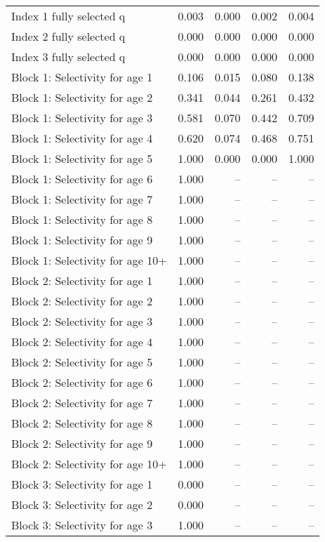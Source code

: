 \documentclass[
]{article}
\begin{document}
\begin{landscape}
\begin{longtable}[t]{lrrrr}
\endfoot
\bottomrule
\endlastfoot
Index 1 fully selected q & 0.003 & 0.000 & 0.002 & 0.004\\
Index 2 fully selected q & 0.000 & 0.000 & 0.000 & 0.000\\
Index 3 fully selected q & 0.000 & 0.000 & 0.000 & 0.000\\
Block 1: Selectivity for age 1 & 0.106 & 0.015 & 0.080 & 0.138\\
Block 1: Selectivity for age 2 & 0.341 & 0.044 & 0.261 & 0.432\\
\addlinespace
Block 1: Selectivity for age 3 & 0.581 & 0.070 & 0.442 & 0.709\\
Block 1: Selectivity for age 4 & 0.620 & 0.074 & 0.468 & 0.751\\
Block 1: Selectivity for age 5 & 1.000 & 0.000 & 0.000 & 1.000\\
Block 1: Selectivity for age 6 & 1.000 & -- & -- & --\\
Block 1: Selectivity for age 7 & 1.000 & -- & -- & --\\
\addlinespace
Block 1: Selectivity for age 8 & 1.000 & -- & -- & --\\
Block 1: Selectivity for age 9 & 1.000 & -- & -- & --\\
Block 1: Selectivity for age 10+ & 1.000 & -- & -- & --\\
Block 2: Selectivity for age 1 & 1.000 & -- & -- & --\\
Block 2: Selectivity for age 2 & 1.000 & -- & -- & --\\
\addlinespace
Block 2: Selectivity for age 3 & 1.000 & -- & -- & --\\
Block 2: Selectivity for age 4 & 1.000 & -- & -- & --\\
Block 2: Selectivity for age 5 & 1.000 & -- & -- & --\\
Block 2: Selectivity for age 6 & 1.000 & -- & -- & --\\
Block 2: Selectivity for age 7 & 1.000 & -- & -- & --\\
\addlinespace
Block 2: Selectivity for age 8 & 1.000 & -- & -- & --\\
Block 2: Selectivity for age 9 & 1.000 & -- & -- & --\\
Block 2: Selectivity for age 10+ & 1.000 & -- & -- & --\\
Block 3: Selectivity for age 1 & 0.000 & -- & -- & --\\
Block 3: Selectivity for age 2 & 0.000 & -- & -- & --\\
\addlinespace
Block 3: Selectivity for age 3 & 1.000 & -- & -- & --\\

\end{longtable}
\end{landscape}
\end{document}
